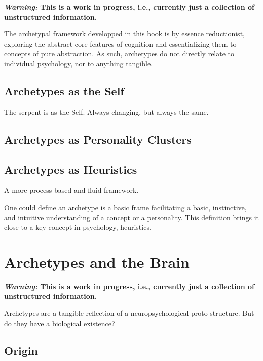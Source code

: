 \documentclass[
]{book}
\begin{document}
\textbf{\emph{Warning:} This is a work in progress, i.e., currently just a collection of unstructured information.}

The archetypal framework developped in this book is by essence reductionist, exploring the abstract core features of cognition and essentializing them to concepts of pure abstraction. As such, archetypes do not directly relate to individual psychology, nor to anything tangible.

\hypertarget{archetypes-as-the-self}{%
\section{Archetypes as the Self}\label{archetypes-as-the-self}}

The serpent is as the Self. Always changing, but always the same.

\hypertarget{archetypes-as-personality-clusters}{%
\section{Archetypes as Personality Clusters}\label{archetypes-as-personality-clusters}}

\hypertarget{archetypes-as-heuristics}{%
\section{Archetypes as Heuristics}\label{archetypes-as-heuristics}}

A more process-based and fluid framework.

One could define an archetype is a basic frame facilitating a basic, instinctive, and intuitive understanding of a concept or a personality. This definition brings it close to a key concept in psychology, heuristics.

\hypertarget{archetypes-and-the-brain}{%
\chapter{Archetypes and the Brain}\label{archetypes-and-the-brain}}

\textbf{\emph{Warning:} This is a work in progress, i.e., currently just a collection of unstructured information.}

Archetypes are a tangible reflection of a neuropsychological proto-structure. But do they have a biological existence?

\hypertarget{origin}{%
\section{Origin}\label{origin}}
\end{document}
